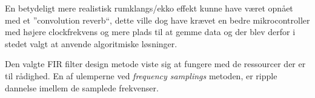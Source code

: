 En betydeligt mere realistisk rumklangs/ekko effekt kunne have været opnået med et ''convolution reverb``, dette ville dog have krævet en bedre mikrocontroller med højere clockfrekvens og mere plads til at gemme data og der blev derfor i stedet valgt at anvende algoritmiske løsninger.

Den valgte FIR filter design metode viste sig at fungere med de ressourcer der er til rådighed. 
En af ulemperne ved \textit{frequency samplings} metoden, er ripple dannelse imellem de samplede frekvenser.



